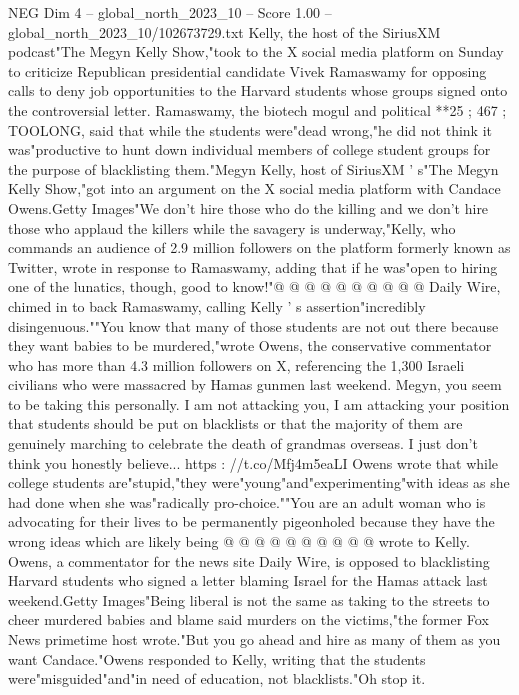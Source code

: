 \begin{textsample}{NEG Dim 4 – global\_north\_2023\_10 – Score 1.00 – global\_north\_2023\_10/102673729.txt}  \label{ex:f4_neg_010}
Kelly, the host of the SiriusXM podcast"The Megyn Kelly Show,"took to the X social media platform on Sunday to criticize Republican presidential candidate Vivek Ramaswamy for opposing calls to deny job opportunities to the Harvard students whose groups signed onto the controversial letter.
Ramaswamy, the biotech mogul and political **25 ; 467 ; TOOLONG, said that while the students were"dead wrong,"he did not think it was"productive to hunt down individual members of college student groups for the purpose of blacklisting them."Megyn Kelly, host of SiriusXM ' s"The Megyn Kelly Show,"got into an argument on the X social media platform with Candace Owens.Getty Images"We don't hire those who do the killing and we don't hire those who applaud the killers while the savagery is underway,"Kelly, who commands an audience of 2.9 million followers on the platform formerly known as Twitter, wrote in response to Ramaswamy, adding that if he was"open to hiring one of the lunatics, though, good to know!"@ @ @ @ @ @ @ @ @ @ Daily Wire, chimed in to back Ramaswamy, calling Kelly ' s assertion"incredibly disingenuous.""You know that many of those students are not out there because they want babies to be murdered,"wrote Owens, the conservative commentator who has more than 4.3 million followers on X, referencing the 1,300 Israeli civilians who were massacred by Hamas gunmen last weekend.
Megyn, you seem to be taking this personally.
I am not attacking you, I am attacking your position that students should be put on blacklists or that the majority of them are genuinely marching to celebrate the death of grandmas overseas.
I just don't think you honestly believe... https : //t.co/Mfj4m5eaLI Owens wrote that while college students are"stupid,"they were"young"and"experimenting"with ideas as she had done when she was"radically pro-choice.""You are an adult woman who is advocating for their lives to be permanently pigeonholed because they have the wrong ideas which are likely being @ @ @ @ @ @ @ @ @ @ wrote to Kelly.
Owens, a commentator for the news site Daily Wire, is opposed to blacklisting Harvard students who signed a letter blaming Israel for the Hamas attack last weekend.Getty Images"Being liberal is not the same as taking to the streets to cheer murdered babies and blame said murders on the victims,"the former Fox News primetime host wrote."But you go ahead and hire as many of them as you want Candace."Owens responded to Kelly, writing that the students were"misguided"and"in need of education, not blacklists."Oh stop it.

\end{textsample}
